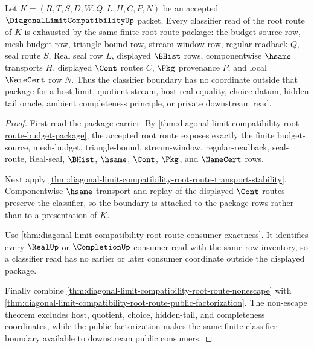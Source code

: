 \begin{theorem}
\label{thm:diagonal-limit-compatibility-root-route-classifier-exhaustion}
Let $K=(R,T,S,D,W,Q,L,H,C,P,N)$ be an accepted $\DiagonalLimitCompatibilityUp$ packet. Every classifier read of the root route of $K$ is exhausted by the same finite root-route package: the budget-source row, mesh-budget row, triangle-bound row, stream-window row, regular readback $Q$, seal route $S$, Real seal row $L$, displayed $\BHist$ rows, componentwise $\hsame$ transports $H$, displayed $\Cont$ routes $C$, $\Pkg$ provenance $P$, and local $\NameCert$ row $N$. Thus the classifier boundary has no coordinate outside that package for a host limit, quotient stream, host real equality, choice datum, hidden tail oracle, ambient completeness principle, or private downstream read.
\end{theorem}
\begin{proof}
First read the package carrier. By \autoref{thm:diagonal-limit-compatibility-root-route-budget-package}, the accepted root route exposes exactly the finite budget-source, mesh-budget, triangle-bound, stream-window, regular-readback, seal-route, Real-seal, $\BHist$, $\hsame$, $\Cont$, $\Pkg$, and $\NameCert$ rows.

Next apply \autoref{thm:diagonal-limit-compatibility-root-route-transport-stability}. Componentwise $\hsame$ transport and replay of the displayed $\Cont$ routes preserve the classifier, so the boundary is attached to the package rows rather than to a presentation of $K$.

Use \autoref{thm:diagonal-limit-compatibility-root-route-consumer-exactness}. It identifies every $\RealUp$ or $\CompletionUp$ consumer read with the same row inventory, so a classifier read has no earlier or later consumer coordinate outside the displayed package.

Finally combine \autoref{thm:diagonal-limit-compatibility-root-route-nonescape} with \autoref{thm:diagonal-limit-compatibility-root-route-public-factorization}. The non-escape theorem excludes host, quotient, choice, hidden-tail, and completeness coordinates, while the public factorization makes the same finite classifier boundary available to downstream public consumers.
\end{proof}

